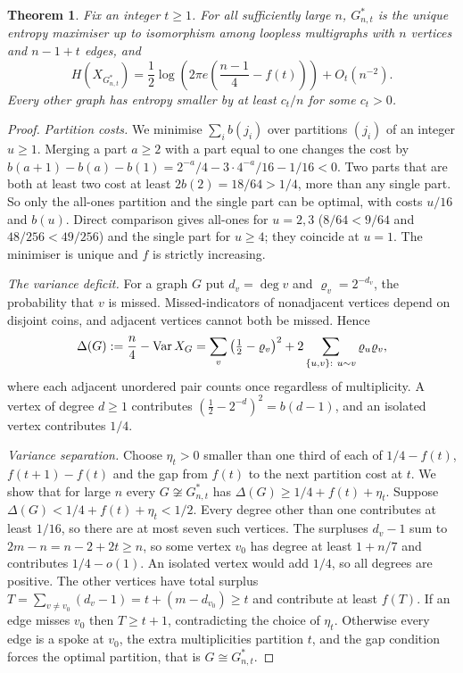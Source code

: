 \documentclass[11pt,a4paper]{article}
\newtheorem{theorem}{Theorem}[section]\newtheorem{lemma}[theorem]{Lemma}\newtheorem{proposition}[theorem]{Proposition}\newtheorem{corollary}[theorem]{Corollary}
\theoremstyle{definition}\newtheorem{remark}[theorem]{Remark}\newtheorem{conjecture}{Conjecture}
\begin{document}
\begin{theorem}\label{thm:coins}
Fix an integer $t\ge1$. For all sufficiently large $n$, $G_{n,t}^*$ is the unique entropy maximiser up to isomorphism among loopless multigraphs with $n$ vertices and $n-1+t$ edges, and
\[
 H(X_{G_{n,t}^*})=\frac12\log\!\left(2\pi e\left(\frac{n-1}4-f(t)\right)\right)+O_t(n^{-2}).
\]
Every other graph has entropy smaller by at least $c_t/n$ for some $c_t>0$.
\end{theorem}
\begin{proof}
\emph{Partition costs.} We minimise $\sum_ib(j_i)$ over partitions $(j_i)$ of an integer $u\ge1$. Merging a part $a\ge2$ with a part equal to one changes the cost by $b(a+1)-b(a)-b(1)=2^{-a}/4-3\cdot4^{-a}/16-1/16<0$. Two parts that are both at least two cost at least $2b(2)=18/64>1/4$, more than any single part. So only the all-ones partition and the single part can be optimal, with costs $u/16$ and $b(u)$. Direct comparison gives all-ones for $u=2,3$ ($8/64<9/64$ and $48/256<49/256$) and the single part for $u\ge4$; they coincide at $u=1$. The minimiser is unique and $f$ is strictly increasing.

\emph{The variance deficit.} For a graph $G$ put $d_v=\deg v$ and $\varrho_v=2^{-d_v}$, the probability that $v$ is missed. Missed-indicators of nonadjacent vertices depend on disjoint coins, and adjacent vertices cannot both be missed. Hence
\begin{equation}\label{eq:coindef}
 \Delta(G):=\frac n4-\operatorname{Var} X_G
 =\sum_v\big(\tfrac12-\varrho_v\big)^2+2\sum_{\{u,v\}:\ u\sim v}\varrho_u\varrho_v ,
\end{equation}
where each adjacent unordered pair counts once regardless of multiplicity. A vertex of degree $d\ge1$ contributes $(\tfrac12-2^{-d})^2=b(d-1)$, and an isolated vertex contributes $1/4$.

\emph{Variance separation.} Choose $\eta_t>0$ smaller than one third of each of $1/4-f(t)$, $f(t+1)-f(t)$ and the gap from $f(t)$ to the next partition cost at $t$. We show that for large $n$ every $G\not\cong G_{n,t}^*$ has $\Delta(G)\ge1/4+f(t)+\eta_t$. Suppose $\Delta(G)<1/4+f(t)+\eta_t<1/2$. Every degree other than one contributes at least $1/16$, so there are at most seven such vertices. The surpluses $d_v-1$ sum to $2m-n=n-2+2t\ge n$, so some vertex $v_0$ has degree at least $1+n/7$ and contributes $1/4-o(1)$. An isolated vertex would add $1/4$, so all degrees are positive. The other vertices have total surplus $T=\sum_{v\ne v_0}(d_v-1)=t+(m-d_{v_0})\ge t$ and contribute at least $f(T)$. If an edge misses $v_0$ then $T\ge t+1$, contradicting the choice of $\eta_t$. Otherwise every edge is a spoke at $v_0$, the extra multiplicities partition $t$, and the gap condition forces the optimal partition, that is $G\cong G_{n,t}^*$.


\end{proof}
\end{document}
